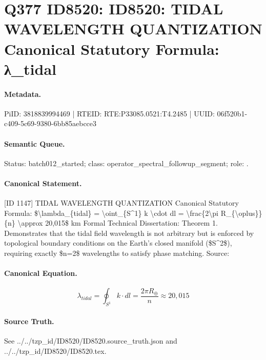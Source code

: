 \section*{Q377 ID8520: ID8520: TIDAL WAVELENGTH QUANTIZATION Canonical Statutory Formula: λ\_tidal}
\paragraph{Metadata.}
PiID: 3818839994469 | RTEID: RTE:P33085.0521:T4.2485 | UUID: 06f520b1-c409-5c69-9380-6bb85aebcce3

\paragraph{Semantic Queue.}
Status: batch012\_started; class: operator\_spectral\_followup\_segment; role: .

\paragraph{Canonical Statement.}
[ID 1147] TIDAL WAVELENGTH QUANTIZATION Canonical Statutory Formula: \$\textbackslash{}lambda\_\{tidal\} = \textbackslash{}oint\_\{S\textasciicircum{}1\} k \textbackslash{}cdot dl = \textbackslash{}frac\{2\textbackslash{}pi R\_\{\textbackslash{}oplus\}\}\{n\} \textbackslash{}approx 20,015\$ km Formal Technical Dissertation: Theorem 1. Demonstrates that the tidal field wavelength is not arbitrary but is enforced by topological boundary conditions on the Earth's closed manifold (\$S\textasciicircum{}2\$), requiring exactly \$n=2\$ wavelengths to satisfy phase matching. Source:

\paragraph{Canonical Equation.}
\[
\lambda_{tidal} = \oint_{S^1} k \cdot dl = \frac{2\pi R_{\oplus}}{n} \approx 20,015
\]

\paragraph{Source Truth.}
See ../../tzp\_id/ID8520/ID8520.source\_truth.json and ../../tzp\_id/ID8520/ID8520.tex.
